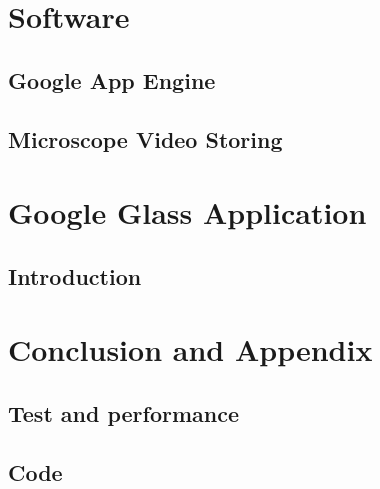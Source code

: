 \documentclass[a4paper,12pt,openany,twoside, abstracton]{book}%
\begin{document}
\part{Software}
\chapter{Google App Engine}
\chapter{Microscope Video Storing}
\part{Google Glass Application}
\clearpage
\chapter{Introduction}\label{ch:IIIintroduction}


\clearpage
\part{Conclusion and Appendix}
\chapter{Test and performance}\label{sec:Perf}

\appendix
\chapter{Code}


\cite{SNOA529A}

\clearpage
\listoffigures
\listoftables

%






\end{document}
